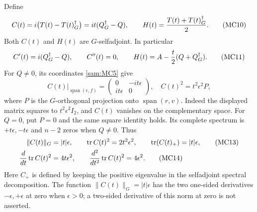 \documentclass[11pt]{article}
\begin{document}
Define
\begin{equation}
 C(t)=i\bigl(T(t)-T(t)^\dagger_G\bigr)
      =it(Q^\dagger_G-Q),\qquad
 H(t)=\frac{T(t)+T(t)^\dagger_G}{2}.
 \tag{MC10}\label{sam:MC10}
\end{equation}
Both \(C(t)\) and \(H(t)\) are \(G\)-selfadjoint. In particular
\begin{equation}
 C'(t)=i(Q^\dagger_G-Q),\qquad C''(t)=0,\qquad
 H(t)=A-\frac t2(Q+Q^\dagger_G).
 \tag{MC11}\label{sam:MC11}
\end{equation}
For \(Q\ne0\), its coordinates \eqref{sam:MC5} give
\begin{equation}
 C(t)|_{\operatorname{span}(e,f)}
 =\begin{pmatrix}0&-it\epsilon\\it\epsilon&0\end{pmatrix},
 \quad
 C(t)^2=t^2\epsilon^2 P,
 \tag{MC12}\label{sam:MC12}
\end{equation}
where \(P\) is the \(G\)-orthogonal projection onto
\(\operatorname{span}(r,v)\). Indeed the displayed matrix squares to
\(t^2\epsilon^2I_2\), and \(C(t)\) vanishes on the complementary space.
For \(Q=0\), put \(P=0\) and the same square identity holds.
Its complete spectrum is \(+t\epsilon,-t\epsilon\) and \(n-2\) zeros
when \(Q\ne0\). Thus
\begin{align}
 \|C(t)\|_G&=|t|\epsilon,\qquad
 \operatorname{tr} C(t)^2=2t^2\epsilon^2,\qquad
 \operatorname{tr}(C(t)_+)=|t|\epsilon, \tag{MC13}\label{sam:MC13}\\
 \frac{d}{dt}\operatorname{tr} C(t)^2&=4t\epsilon^2,\qquad
 \frac{d^2}{dt^2}\operatorname{tr} C(t)^2=4\epsilon^2.
 \tag{MC14}\label{sam:MC14}
\end{align}
Here \(C_+\) is defined by keeping the positive eigenvalue in the
selfadjoint spectral decomposition. The function
\(\|C(t)\|_G=|t|\epsilon\) has the two one-sided derivatives
\(-\epsilon,+\epsilon\) at zero when \(\epsilon>0\); a two-sided
derivative of this norm at zero is not asserted.
\end{document}
